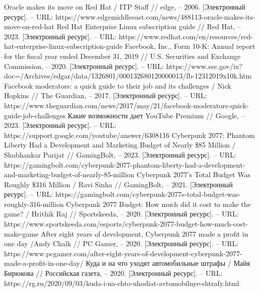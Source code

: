 \documentclass{article}
\begin{document}
\begin{thebibliography}{2}
 Oracle makes its move on Red Hat / ITP Staff // edge, – 2006. [Электронный ресурс]. – URL: https://www.edgemiddleeast.com/news/488113-oracle-makes-its-move-on-red-hat
 Red Hat Enterprise Linux subscription guide // Red Hat, – 2023. [Электронный ресурс]. – URL: https://www.redhat.com/en/resources/red-hat-enterprise-linux-subscription-guide
 Facebook, Inc., Form 10-K: Annual report for the fiscal year ended December 31, 2019 // U.S. Securities and Exchange Commission, – 2020. [Электронный ресурс]. – URL: https://www.sec.gov/ix?doc=/Archives/edgar/data/1326801/000132680120000013/fb-12312019x10k.htm
 Facebook moderators: a quick guide to their job and its challenges / Nick Hopkins // The Guardian, – 2017. [Электронный ресурс]. – URL: https://www.theguardian.com/news/2017/may/21/facebook-moderators-quick-guide-job-challenges
 Какие возможности дает YouTube Premium // Google, – 2023. [Электронный ресурс]. – URL: https://support.google.com/youtube/answer/6308116
 Cyberpunk 2077: Phantom Liberty Had a Development and Marketing Budget of Nearly \$85 Million / Shubhankar Parijat // GamingBolt, – 2023. [Электронный ресурс]. – URL: https://gamingbolt.com/cyberpunk-2077-phantom-liberty-had-a-development-and-marketing-budget-of-nearly-85-million
 Cyberpunk 2077’s Total Budget Was Roughly \$316 Million / Ravi Sinha // GamingBolt, – 2021. [Электронный ресурс]. – URL: https://gamingbolt.com/cyberpunk-2077s-total-budget-was-roughly-316-million
 Cyberpunk 2077 Budget: How much did it cost to make the game? / Hrithik Raj // Sportskeeda, – 2020. [Электронный ресурс]. – URL: https://www.sportskeeda.com/esports/cyberpunk-2077-budget-how-much-cost-make-game
 After eight years of development, Cyberpunk 2077 made a profit in one day /Andy Chalk // PC Gamer, – 2020. [Электронный ресурс]. – URL: https://www.pcgamer.com/after-eight-years-of-development-cyberpunk-2077-made-a-profit-in-one-day/
 Куда и на что уходят автомобильные штрафы / Майя Бирюкова // Российская газета, – 2020. [Электронный ресурс]. – URL: https://rg.ru/2020/09/03/kuda-i-na-chto-uhodiat-avtomobilnye-shtrafy.html
\end{thebibliography} 
\end{document}
